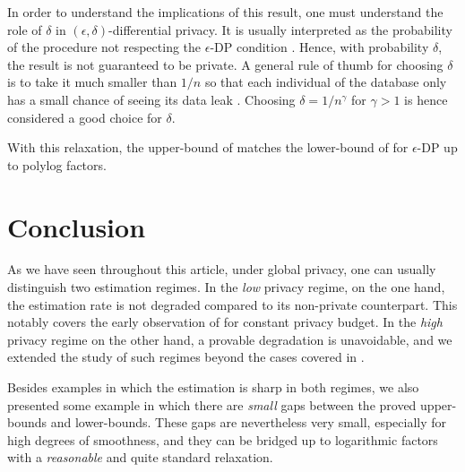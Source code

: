 \documentclass[10pt]{article} %
\begin{document}
In order to understand the implications of this result, one must understand the role of $\delta$ in $(\epsilon, \delta)$-differential privacy. It is usually interpreted as the probability of the procedure not respecting the $\epsilon$-DP condition \citep{dwork2014algorithmic}. Hence, with probability $\delta$, the result is not guaranteed to be private. A general rule of thumb for choosing $\delta$ is to take it much smaller than $1/n$ so that each individual of the database only has a small chance of seeing its data leak \citep{dwork2014algorithmic}. Choosing $\delta = 1/n^\gamma$ for $\gamma > 1$ is hence considered a good choice for $\delta$.

With this relaxation, the upper-bound of  matches the lower-bound of  for $\epsilon$-DP up to polylog factors.

\section{Conclusion}\label{sec:ccl}

As we have seen throughout this article, under global privacy, one can usually distinguish two estimation regimes. In the \emph{low} privacy regime, on the one hand, the estimation rate is not degraded compared to its non-private counterpart. This notably covers the early observation of \citet{wasserman2010statistical} for constant privacy budget. 
In the \emph{high} privacy regime on the other hand, a provable degradation is unavoidable,  %
and we extended the study of such regimes beyond the cases covered in \citet{barber2014privacy}.

Besides examples in which the estimation is sharp in both regimes, we also presented some example in which there are \emph{small} gaps between the proved upper-bounds and lower-bounds. These gaps are nevertheless very small, especially for high degrees of smoothness, and they can be bridged up to logarithmic factors with a \emph{reasonable} and quite standard relaxation.


\end{document}

